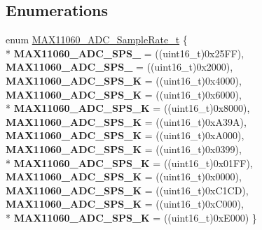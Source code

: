 \subsection*{Enumerations}
\begin{DoxyCompactItemize}
\item 
enum \hyperlink{group__max11060_ga2a33837c760006578f634282dafeeee8}{M\+A\+X11060\+\_\+\+A\+D\+C\+\_\+\+Sample\+Rate\+\_\+t} \{ \\*
{\bfseries M\+A\+X11060\+\_\+\+A\+D\+C\+\_\+\+S\+P\+S\+\_} = ((uint16\+\_\+t)0x25\+F\+F), 
{\bfseries M\+A\+X11060\+\_\+\+A\+D\+C\+\_\+\+S\+P\+S\+\_} = ((uint16\+\_\+t)0x2000), 
{\bfseries M\+A\+X11060\+\_\+\+A\+D\+C\+\_\+\+S\+P\+S\+\_\+K} = ((uint16\+\_\+t)0x4000), 
{\bfseries M\+A\+X11060\+\_\+\+A\+D\+C\+\_\+\+S\+P\+S\+\_\+K} = ((uint16\+\_\+t)0x6000), 
\\*
{\bfseries M\+A\+X11060\+\_\+\+A\+D\+C\+\_\+\+S\+P\+S\+\_\+K} = ((uint16\+\_\+t)0x8000), 
{\bfseries M\+A\+X11060\+\_\+\+A\+D\+C\+\_\+\+S\+P\+S\+\_\+K} = ((uint16\+\_\+t)0x\+A39\+A), 
{\bfseries M\+A\+X11060\+\_\+\+A\+D\+C\+\_\+\+S\+P\+S\+\_\+K} = ((uint16\+\_\+t)0x\+A000), 
{\bfseries M\+A\+X11060\+\_\+\+A\+D\+C\+\_\+\+S\+P\+S\+\_\+K} = ((uint16\+\_\+t)0x0399), 
\\*
{\bfseries M\+A\+X11060\+\_\+\+A\+D\+C\+\_\+\+S\+P\+S\+\_\+K} = ((uint16\+\_\+t)0x01\+F\+F), 
{\bfseries M\+A\+X11060\+\_\+\+A\+D\+C\+\_\+\+S\+P\+S\+\_\+K} = ((uint16\+\_\+t)0x0000), 
{\bfseries M\+A\+X11060\+\_\+\+A\+D\+C\+\_\+\+S\+P\+S\+\_\+K} = ((uint16\+\_\+t)0x\+C1\+C\+D), 
{\bfseries M\+A\+X11060\+\_\+\+A\+D\+C\+\_\+\+S\+P\+S\+\_\+K} = ((uint16\+\_\+t)0x\+C000), 
\\*
{\bfseries M\+A\+X11060\+\_\+\+A\+D\+C\+\_\+\+S\+P\+S\+\_\+K} = ((uint16\+\_\+t)0x\+E000)
 \}
\end{DoxyCompactItemize}
